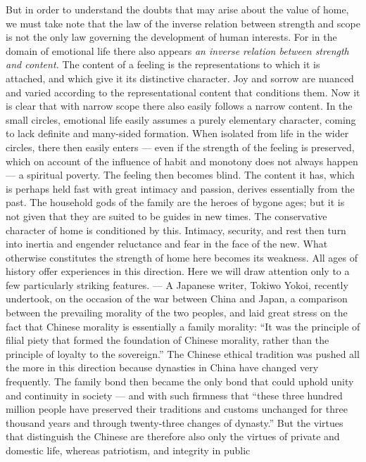 \documentclass[12pt,a4paper]{article}
\newcommand{\opage}[1]{\marginnote{\footnotesize\textit{[#1]}}}
\begin{document}
But in order to understand the doubts that may arise about the \opage{8}value
of home, we must take note that the law of the inverse relation
between strength and scope is not the only law governing the
development of human interests. For in the domain of emotional life
there also appears \emph{an inverse relation between strength and content.}
The content of a feeling is the representations to which it is
attached, and which give it its distinctive character. Joy and sorrow
are nuanced and varied according to the representational content that
conditions them. Now it is clear that with narrow scope there also
easily follows a narrow content. In the small circles, emotional life
easily assumes a purely elementary character, coming to lack definite
and many-sided formation. When isolated from life in the wider
circles, there then easily enters --- even if the strength of the
feeling is preserved, which on account of the influence of habit and
monotony does not always happen --- a spiritual poverty. The feeling
then becomes blind. The content it has, which is perhaps held fast
with great intimacy and passion, derives essentially from the past.
The household gods of the family are the heroes of bygone ages; but
it is not given that they are suited to be guides in new times. The
conservative character of home is conditioned by this. Intimacy,
security, and rest then turn into inertia and engender reluctance and
fear in the face of the new. What otherwise constitutes the strength
of home here becomes its weakness. All ages of history offer
experiences in this direction. Here we will draw attention only to a
few particularly striking features. --- A Japanese writer, Tokiwo
Yokoi, recently undertook, on the occasion of the war between China
and Japan, a comparison between the prevailing morality of the two
peoples, and laid great stress on the fact that Chinese morality is
essentially a family morality: ``It was the principle of filial piety
that formed the foundation of Chinese morality, rather than the
principle of loyalty to the sovereign.'' The Chinese ethical tradition
was pushed all the more in this direction because dynasties in China
have changed very frequently. The family bond then became the only
bond that could uphold unity and continuity in society --- and with
such firmness that ``these three hundred million people have preserved
their traditions and customs unchanged for three thousand years and
through twenty-three changes of dynasty.'' But the virtues that
distinguish the Chinese are therefore also only the virtues of
private and domestic life, whereas patriotism, and integrity in public
\end{document}
